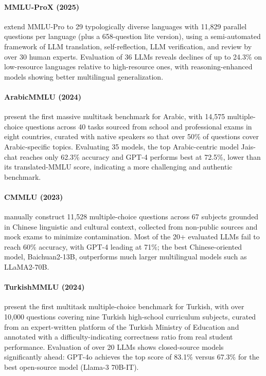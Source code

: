 \documentclass[letterpaper]{article}
\begin{document}
\paragraph{MMLU-ProX (2025)} \citet{xuan2025mmlu} extend MMLU-Pro to 29 typologically diverse languages with 11,829 parallel questions per language (plus a 658-question lite version), using a semi-automated framework of LLM translation, self-reflection, LLM verification, and review by over 30 human experts. Evaluation of 36 LLMs reveals declines of up to 24.3\% on low-resource languages relative to high-resource ones, with reasoning-enhanced models showing better multilingual generalization.

\paragraph{ArabicMMLU (2024)} \citet{koto2024arabicmmlu} present the first massive multitask benchmark for Arabic, with 14,575 multiple-choice questions across 40 tasks sourced from school and professional exams in eight countries, curated with native speakers so that over 50\% of questions cover Arabic-specific topics. Evaluating 35 models, the top Arabic-centric model Jais-chat reaches only 62.3\% accuracy and GPT-4 performs best at 72.5\%, lower than its translated-MMLU score, indicating a more challenging and authentic benchmark.

\paragraph{CMMLU (2023)} \citet{li2023cmmlu} manually construct 11,528 multiple-choice questions across 67 subjects grounded in Chinese linguistic and cultural context, collected from non-public sources and mock exams to minimize contamination. Most of the 20+ evaluated LLMs fail to reach 60\% accuracy, with GPT-4 leading at 71\%; the best Chinese-oriented model, Baichuan2-13B, outperforms much larger multilingual models such as LLaMA2-70B.

\paragraph{TurkishMMLU (2024)} \citet{yuksel2024turkishmmlu} present the first multitask multiple-choice benchmark for Turkish, with over 10,000 questions covering nine Turkish high-school curriculum subjects, curated from an expert-written platform of the Turkish Ministry of Education and annotated with a difficulty-indicating correctness ratio from real student performance. Evaluation of over 20 LLMs shows closed-source models significantly ahead: GPT-4o achieves the top score of 83.1\% versus 67.3\% for the best open-source model (Llama-3 70B-IT).
\end{document}
